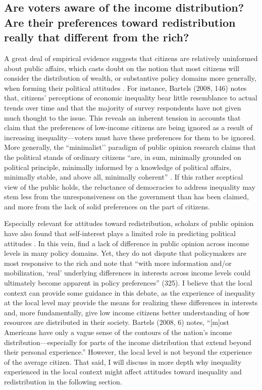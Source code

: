 \documentclass[12pt, letter]{scrartcl}
\begin{document}
\subsection{Are voters aware of the income distribution? Are their preferences toward redistribution really that different from the rich?}
\doublespacing
A great deal of empirical evidence suggests that citizens are relatively uninformed about public affairs, which casts doubt on the notion that most citizens will consider the distribution of wealth, or substantive policy domains more generally, when forming their political attitudes \parencite{kuklinski2000reconsidering, achen2017democracy, converse2006nature}. For instance, Bartels (2008, 146) notes that, citizens' perceptions of economic inequality bear little resemblance to actual trends over time and that the majority of survey respondents have not given much thought to the issue. This reveals an inherent tension in accounts that claim that the preferences of low-income citizens are being ignored as a result of increasing inequality---voters must have these preferences for them to be ignored. More generally, the ``minimalist’’ paradigm of public opinion research claims that the political stands of ordinary citizens ``are, in sum, minimally grounded on political principle, minimally informed by a knowledge of political affairs, minimally stable, and above all, minimally coherent'' \parencite[67]{sniderman2000taking}. If this rather sceptical view of the public holds, the reluctance of democracies to address inequality may stem less from the unresponsiveness on the government than has been claimed, and more from the lack of solid preferences on the part of citizens.

Especially relevant for attitudes toward redistribution, scholars of public opinion have also found that self-interest plays a limited role in predicting political attitudes \parencite{kinder1998opinion, sears1991role}. In this vein, \textcite{soroka2008limits} find a lack of difference in public opinion across income levels in many policy domains. Yet, they do not dispute that policymakers are most responsive to the rich and note that ``with more information and/or mobilization, `real' underlying differences in interests across income levels could ultimately become apparent in policy preferences'' (325). I believe that the local context can provide some guidance in this debate, as the experience of inequality at the local level may provide the means for realizing these differences in interests and, more fundamentally, give low income citizens better understanding of how resources are distributed in their society. Bartels (2008, 6) notes, ``[m]ost Americans have only a vague sense of the contours of the nation’s income distribution---especially for parts of the income distribution that extend beyond their personal experience.'' However, the local level is not beyond the experience of the average citizen. That said, I will discuss in more depth why inequality experienced in the local context might affect attitudes toward inequality and redistribution in the following section.
\end{document}
